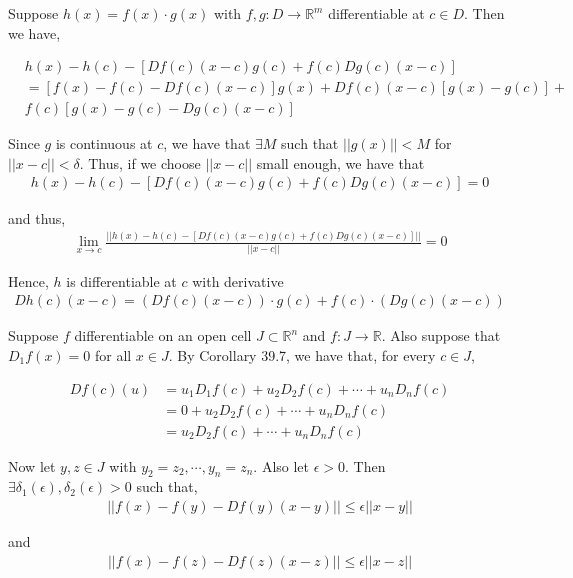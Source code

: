 \documentclass[12pt]{article}
\newenvironment{problem}[2][Problem]{\begin{trivlist}
\item[\hskip \labelsep {\bfseries #1}\hskip \labelsep {\bfseries #2.}]}{\end{trivlist}}
\begin{document}
Suppose $h(x) = f(x) \cdot g(x)$ with $f, g: D \to \mathbb{R}^m$ differentiable at $c \in D$. Then we have,

\begin{align*}
&h(x) - h(c) - [Df(c)(x-c)g(c) + f(c)Dg(c)(x-c)]\\
&= [f(x) - f(c) - Df(c)(x-c)]g(x) + Df(c)(x-c)[g(x) - g(c)] +\\
 &f(c)[g(x) - g(c) - Dg(c)(x-c)]
\end{align*}

Since $g$ is continuous at $c$, we have that $\exists M$ such that $||g(x)|| < M$ for $||x - c|| < \delta$. Thus, if we choose $||x - c||$ small enough, we have that 
\begin{align*}
h(x) - h(c) - [Df(c)(x-c)g(c) + f(c)Dg(c)(x-c)] = 0
\end{align*}

and thus,
\begin{align*}
\lim_{x \to c} \frac{||h(x) - h(c) - [Df(c)(x-c)g(c) + f(c)Dg(c)(x-c)]||}{||x-c||} = 0
\end{align*}

Hence, $h$ is differentiable at $c$ with derivative
\begin{align*}
Dh(c)(x-c) = (Df(c)(x-c)) \cdot g(c) + f(c) \cdot (Dg(c)(x-c))
\end{align*}

\begin{problem}{4}
\end{problem}

Suppose $f$ differentiable on an open cell $J \subset \mathbb{R}^n$ and $f: J \to \mathbb{R}$. Also suppose that $D_1f(x) = 0$ for all $x \in J$. By Corollary 39.7, we have that, for every $c \in J$,

\begin{align*}
Df(c)(u) &= u_1D_1f(c) + u_2D_2f(c) + \cdots + u_nD_nf(c)\\
&= 0 + u_2D_2f(c) + \cdots + u_nD_nf(c)\\
&= u_2D_2f(c) + \cdots + u_nD_nf(c)
\end{align*}

Now let $y, z \in J$ with $y_{2} = z_{2}, \cdots, y_{n} = z_{n}$. Also let $\epsilon > 0$. Then $\exists \delta_1(\epsilon), \delta_2(\epsilon) > 0$ such that,
\begin{align}
||f(x) - f(y) - Df(y)(x - y)|| \leq \epsilon ||x - y||
\end{align}

and
\begin{align}
||f(x) - f(z) - Df(z)(x - z)|| \leq \epsilon ||x - z||
\end{align}
\end{document}
